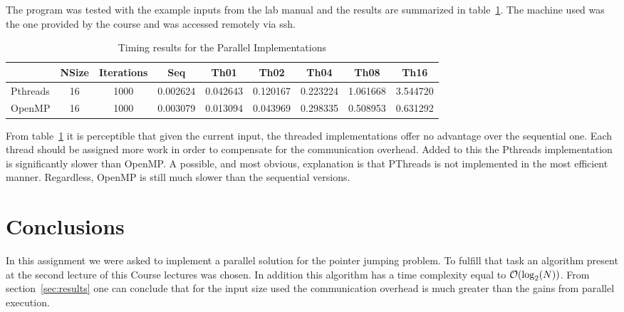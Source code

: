 The program was tested with the example inputs from the lab manual and the results are summarized in table~\ref{tbl:results}. The machine used was the one provided by the course and was accessed remotely via ssh.

\begin{table}[H]
\centering
\begin{tabular}{lcccccccc}
         & NSize & Iterations & Seq      & Th01      & Th02      & Th04      & Th08      & Th16
\\\midrule
Pthreads	& 16 &      1000 & 0.002624 &  0.042643 &  0.120167 &  0.223224 &  1.061668 &  3.544720\\
OpenMP		& 16 &      1000 & 0.003079 &  0.013094 &  0.043969 &  0.298335 &  0.508953 &  0.631292
\end{tabular}
\caption{Timing results for the Parallel Implementations}
\label{tbl:results}
\end{table}

From table~\ref{tbl:results} it is perceptible that given the current input, the threaded implementations offer no advantage over the sequential one. Each thread should be assigned more work in order to compensate for the communication overhead. Added to this the Pthreads implementation is significantly slower than OpenMP. A possible, and most obvious, explanation is that PThreads is not implemented in the most efficient manner. Regardless, OpenMP is still much slower than the sequential versions.

\section{Conclusions}

In this assignment we were asked to implement a parallel solution for the pointer jumping problem. To fulfill that task an algorithm present at the second lecture of this Course lectures was chosen. In addition this algorithm has a time complexity equal to  $\mathcal{O}(\log_2(N))$.
From section~\ref{sec:results} one can conclude that for the input size used the communication overhead is much greater than the gains from parallel execution.
